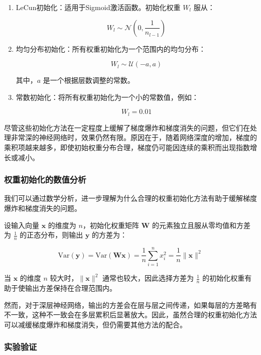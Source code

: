 \documentclass[12pt,a4paper]{amsart}
\begin{document}
\begin{enumerate}


  \item LeCun初始化：适用于Sigmoid激活函数。初始化权重 \( W_l \) 服从：

  \[ W_l \sim \mathcal{N}\left(0, \frac{1}{n_{l-1}}\right) \]

  \item 均匀分布初始化：所有权重初始化为一个范围内的均匀分布：

  \[ W_l \sim \mathcal{U}(-a, a) \]

  其中，\( a \) 是一个根据层数调整的常数。

  \item 常数初始化：将所有权重初始化为一个小的常数值，例如：

  \[ W_l = 0.01 \]

\end{enumerate}

尽管这些初始化方法在一定程度上缓解了梯度爆炸和梯度消失的问题，但它们在处理非常深的神经网络时，效果仍然有限。原因在于，随着网络深度的增加，梯度的乘积项越来越多，即使初始权重分布合理，梯度仍可能因连续的乘积而出现指数增长或减小。

\subsubsection{权重初始化的数值分析}

我们可以通过数学分析，进一步理解为什么合理的权重初始化方法有助于缓解梯度爆炸和梯度消失的问题。

设输入向量 \( \mathbf{x} \) 的维度为 \( n \)，初始化权重矩阵 \( \mathbf{W} \) 的元素独立且服从零均值和方差为 \( \frac{1}{n} \) 的正态分布，则输出 \( \mathbf{y} \) 的方差为：

\[ \text{Var}(\mathbf{y}) = \text{Var}(\mathbf{W}\mathbf{x}) = \frac{1}{n} \sum_{i=1}^n x_i^2 = \frac{1}{n} \|\mathbf{x}\|^2 \]

当 \(\mathbf{x}\) 的维度 \( n \) 较大时，\(\|\mathbf{x}\|^2\) 通常也较大，因此选择方差为 \(\frac{1}{n}\) 的初始化权重有助于使输出方差保持在合理范围内。

然而，对于深层神经网络，输出的方差会在层与层之间传递，如果每层的方差略有不一致，这种不一致会在多层累积后显著放大。因此，虽然合理的权重初始化方法可以减缓梯度爆炸和梯度消失，但仍需要其他方法的配合。

\subsubsection{实验验证}
\end{document}

